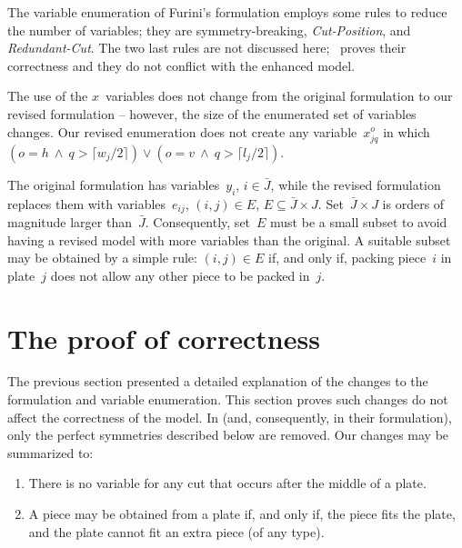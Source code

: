 \documentclass[ppgc,prop-tese,english,formais,babel]{iiufrgs}
\begin{document}
The variable enumeration of Furini's formulation employs some rules to reduce the number of variables; they are symmetry-breaking, \emph{Cut-Position}, and \emph{Redundant-Cut}.
The two last rules are not discussed here; \citet{furini:2016}~proves their correctness and they do not conflict with the enhanced model.

The use of the \(x\)~variables does not change from the original formulation to our revised formulation -- however, the size of the enumerated set of variables changes.
Our revised enumeration does not create any variable~\(x^o_{jq}\) in which \((o = h~\land~q > \lceil w_j / 2 \rceil) \lor (o = v~\land~q > \lceil l_j / 2 \rceil)\).

The original formulation has variables~\(y_i\), \(i \in \bar{J}\), while the revised formulation replaces them with variables~\(e_{ij}\), \((i, j) \in E\), \(E \subseteq \bar{J} \times J\).
Set~\(\bar{J} \times J\) is orders of magnitude larger than~\(\bar{J}\).
Consequently, set~\(E\) must be a small subset to avoid having a revised model with more variables than the original.
A suitable subset may be obtained by a simple rule: \((i, j) \in E\) if, and only if, packing piece~\(i\) in plate~\(j\) does not allow any other piece to be packed in~\(j\).


\section{The proof of correctness}

The previous section presented a detailed explanation of the changes to the formulation and variable enumeration.
This section proves such changes do not affect the correctness of the model.
In \citet{furini:2016} (and, consequently, in their formulation), only the perfect symmetries described below are removed.
Our changes may be summarized to:

\begin{enumerate}
\item There is no variable for any cut that occurs after the middle of a plate.
\item A piece may be obtained from a plate if, and only if, the piece fits the plate, and the plate cannot fit an extra piece (of any type).
\end{enumerate}
\end{document}
